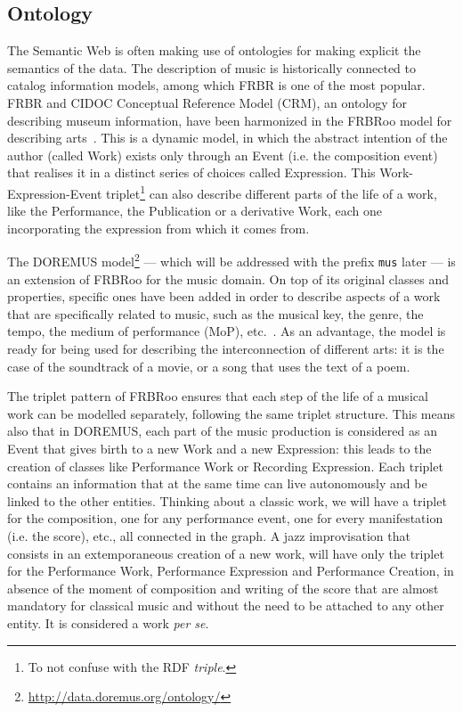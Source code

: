 \subsection{Ontology}\label{subsec:onto}
The Semantic Web is often making use of ontologies for making explicit the semantics of the data. The description of music is historically connected to catalog information models, among which FRBR is one of the most popular. FRBR and CIDOC Conceptual Reference Model (CRM), an ontology for describing museum information, have been harmonized in the FRBRoo model for describing arts~\cite{doerr2008frbroo}. This is a dynamic model, in which the abstract intention of the author (called Work) exists only through an Event (i.e. the composition event) that realises it in a distinct series of choices called Expression. This Work-Expression-Event triplet\footnote{To not confuse with the RDF \textit{triple}.} can also describe different parts of the life of a work, like the Performance, the Publication or a derivative Work, each one incorporating the expression from which it comes from.

The DOREMUS model\footnote{\url{http://data.doremus.org/ontology/}} --- which will be addressed with the prefix \texttt{mus} later --- is an extension of FRBRoo for the music domain. On top of its original classes and properties, specific ones have been added in order to describe aspects of a work that are specifically related to music, such as the musical key, the genre, the tempo, the medium of performance (MoP), etc.~\cite{choffe2016doremus}. As an advantage, the model is ready for being used for describing the interconnection of different arts: it is the case of the soundtrack of a movie, or a song that uses the text of a poem.

The triplet pattern of FRBRoo ensures that each step of the life of a musical work can be modelled separately, following the same triplet structure. This means also that in DOREMUS, each part of the music production is considered as an Event that gives birth to a new Work and a new Expression: this leads to the creation of classes like Performance Work or Recording Expression. Each triplet contains an information that at the same time can live autonomously and be linked to the other entities. Thinking about a classic work, we will have a triplet for the composition, one for any performance event, one for every manifestation (i.e. the score), etc., all connected in the graph. A jazz improvisation that consists in an extemporaneous creation of a new work, will have only the triplet for the Performance Work, Performance Expression and Performance Creation, in absence of the moment of composition and writing of the score that are almost mandatory for classical music and without the need to be attached to any other entity. It is considered a work \textit{per se}.

